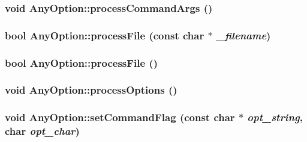 \label{classAnyOption_acbb92b2ed06429530419797e27a66835}
\hypertarget{classAnyOption_a1f21716ac11330a364fe1d8a17efa7dc}{
\subsubsection[{processCommandArgs}]{\setlength{\rightskip}{0pt plus 5cm}void AnyOption::processCommandArgs ()}}
\label{classAnyOption_a1f21716ac11330a364fe1d8a17efa7dc}
\hypertarget{classAnyOption_a9f28e85054331866e0f32bf5a8088607}{
\subsubsection[{processFile}]{\setlength{\rightskip}{0pt plus 5cm}bool AnyOption::processFile (const char $\ast$ {\em \_\-filename})}}
\label{classAnyOption_a9f28e85054331866e0f32bf5a8088607}
\hypertarget{classAnyOption_ac1de1647788ce0f5bed576d90e518124}{
\subsubsection[{processFile}]{\setlength{\rightskip}{0pt plus 5cm}bool AnyOption::processFile ()}}
\label{classAnyOption_ac1de1647788ce0f5bed576d90e518124}
\hypertarget{classAnyOption_a0b123acf86297aa6265229bdd13a827a}{
\subsubsection[{processOptions}]{\setlength{\rightskip}{0pt plus 5cm}void AnyOption::processOptions ()}}
\label{classAnyOption_a0b123acf86297aa6265229bdd13a827a}
\hypertarget{classAnyOption_ad7720617bda6fb5519d195989c8605f2}{
\subsubsection[{setCommandFlag}]{\setlength{\rightskip}{0pt plus 5cm}void AnyOption::setCommandFlag (const char $\ast$ {\em opt\_\-string}, \/  char {\em opt\_\-char})}}
